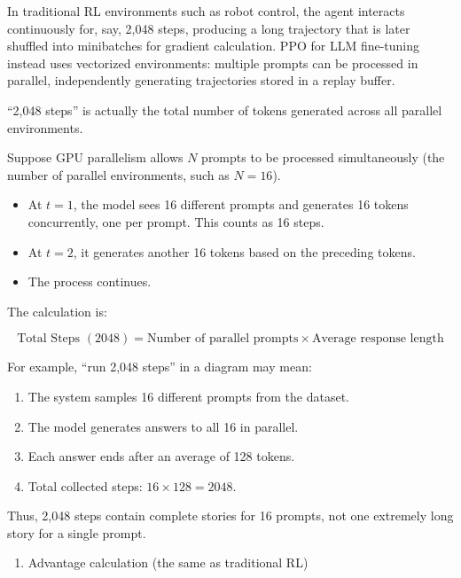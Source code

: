 In traditional RL environments such as robot control, the agent interacts continuously for, say, 2,048 steps, producing a long trajectory that is later shuffled into minibatches for gradient calculation. PPO for LLM fine-tuning instead uses vectorized environments: multiple prompts can be processed in parallel, independently generating trajectories stored in a replay buffer.

``2,048 steps'' is actually the total number of tokens generated across all parallel environments.

Suppose GPU parallelism allows \(N\) prompts to be processed simultaneously (the number of parallel environments, such as \(N = 16\)).

\begin{itemize}
\tightlist
\item
  At \(t = 1\), the model sees 16 different prompts and generates 16 tokens concurrently, one per prompt. This counts as 16 steps.
\item
  At \(t = 2\), it generates another 16 tokens based on the preceding tokens.
\item
  The process continues.
\end{itemize}

The calculation is:

\[
\text{Total Steps }(2048)
=
\text{Number of parallel prompts}
\times
\text{Average response length}
\]

For example, ``run 2,048 steps'' in a diagram may mean:

\begin{enumerate}
\def\labelenumi{\arabic{enumi}.}
\tightlist
\item
  The system samples 16 different prompts from the dataset.
\item
  The model generates answers to all 16 in parallel.
\item
  Each answer ends after an average of 128 tokens.
\item
  Total collected steps: \(16 \times 128 = 2048\).
\end{enumerate}

Thus, 2,048 steps contain complete stories for 16 prompts, not one extremely long story for a single prompt.

\begin{enumerate}
\def\labelenumi{\arabic{enumi}.}
\setcounter{enumi}{1}
\tightlist
\item
  Advantage calculation (the same as traditional RL)
\end{enumerate}

